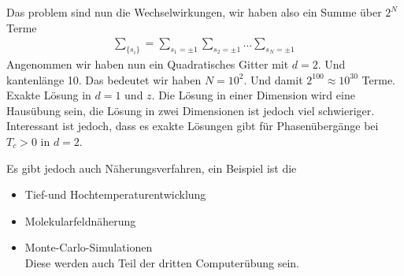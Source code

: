 \begin{description}
        Das problem sind nun die Wechselwirkungen, wir haben also ein Summe  
        über $2^N$ Terme
        \begin{align*}
          \sum_{\{s_i\}}^{} = \sum_{s_1 = \pm 1}^{} \sum_{s_2 = \pm 1}^{} \ldots\sum_{s_N = \pm 1}^{}
        \end{align*}
        Angenommen wir haben nun ein Quadratisches Gitter mit $d=2$.  Und
        kantenlänge 10. Das bedeutet  wir haben $N= 10^2$. Und damit
        $2^{100} \approx 10^{30}$ Terme. Exakte Lösung in 
        $d = 1$ und $z$. Die Lösung in einer Dimension wird eine Hausübung sein,
        die Lösung in zwei Dimensionen ist jedoch viel schwieriger. Interessant
        ist jedoch, dass es exakte Lösungen gibt für Phasenübergänge bei
        $T_c > 0$ in $d=2$.

        Es gibt jedoch auch Näherungsverfahren, ein Beispiel ist die 
        
        \begin{itemize}
          \item Tief-und Hochtemperaturentwicklung
          \item Molekularfeldnäherung
          \item Monte-Carlo-Simulationen \\
            Diese werden auch Teil der dritten Computerübung sein.
        \end{itemize}
      
    \end{description}
